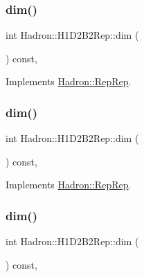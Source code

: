 \subsubsection{\texorpdfstring{dim()}{dim()}\hspace{0.1cm}{\footnotesize\ttfamily [3/5]}}
{\footnotesize\ttfamily int Hadron\+::\+H1\+D2\+B2\+Rep\+::dim (\begin{DoxyParamCaption}{ }\end{DoxyParamCaption}) const\hspace{0.3cm}{\ttfamily [inline]}, {\ttfamily [virtual]}}



Implements \mbox{\hyperlink{structHadron_1_1RepRep_a92c8802e5ed7afd7da43ccfd5b7cd92b}{Hadron\+::\+Rep\+Rep}}.

\mbox{\label{structHadron_1_1H1D2B2Rep_a85eefb2c84f92b80d516a6da91a49911}} 
\subsubsection{\texorpdfstring{dim()}{dim()}\hspace{0.1cm}{\footnotesize\ttfamily [4/5]}}
{\footnotesize\ttfamily int Hadron\+::\+H1\+D2\+B2\+Rep\+::dim (\begin{DoxyParamCaption}{ }\end{DoxyParamCaption}) const\hspace{0.3cm}{\ttfamily [inline]}, {\ttfamily [virtual]}}



Implements \mbox{\hyperlink{structHadron_1_1RepRep_a92c8802e5ed7afd7da43ccfd5b7cd92b}{Hadron\+::\+Rep\+Rep}}.

\mbox{\label{structHadron_1_1H1D2B2Rep_a85eefb2c84f92b80d516a6da91a49911}} 
\subsubsection{\texorpdfstring{dim()}{dim()}\hspace{0.1cm}{\footnotesize\ttfamily [5/5]}}
{\footnotesize\ttfamily int Hadron\+::\+H1\+D2\+B2\+Rep\+::dim (\begin{DoxyParamCaption}{ }\end{DoxyParamCaption}) const\hspace{0.3cm}{\ttfamily [inline]}, {\ttfamily [virtual]}}



